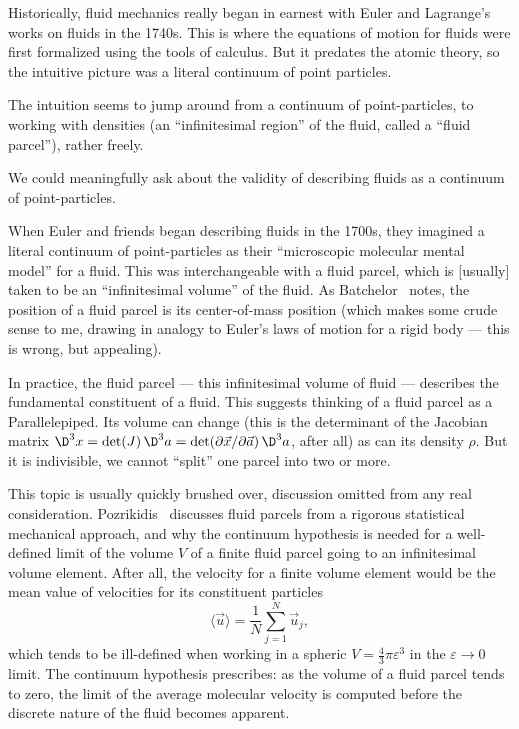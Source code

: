 \begin{node}\label{fluids:describing-0009}%
Historically, fluid mechanics really began in earnest with Euler and
Lagrange's works on fluids in the 1740s. This is where the equations of
motion for fluids were first formalized using the tools of calculus. But
it predates the atomic theory, so the intuitive picture was a literal
continuum of point particles.

The intuition seems to jump around from a continuum of point-particles,
to working with densities (an ``infinitesimal region'' of the fluid,
called a ``fluid parcel''), rather freely.

We could meaningfully ask about the validity of describing fluids as a
continuum of point-particles.

\begin{node}\label{fluids:describing-000O}%
When Euler and friends began describing fluids in the 1700s, they
imagined a literal continuum of point-particles as their ``microscopic
molecular mental model'' for a fluid. This was interchangeable with a
fluid parcel, which is [usually] taken to be an ``infinitesimal volume''
of the fluid. As Batchelor~\cite[pg.71]{batchelor1967introduction}
notes, the position of a fluid parcel is its center-of-mass position
(which makes some crude sense to me, drawing in analogy to Euler's laws
of motion for a rigid body --- this is wrong, but appealing).

In practice, the fluid parcel --- this infinitesimal volume of fluid ---
describes the fundamental constituent of a fluid. This suggests thinking
of a fluid parcel as a Parallelepiped. Its volume can change (this is
the determinant of the Jacobian matrix
$\D^{3}x=\det(J)\,\D^{3}a=\det(\partial\vec{x}/\partial\vec{a})\,\D^{3}a$,
after all) as can its density $\rho$. But it is indivisible, we cannot
``split'' one parcel into two or more.

This topic is usually quickly brushed over, discussion omitted from any
real consideration. Pozrikidis~\cite[\S1.4]{pozrikidis2009fluid}
discusses fluid parcels from a rigorous statistical mechanical approach,
and why the continuum hypothesis is needed for a well-defined limit of
the volume $V$ of a finite fluid parcel going to an infinitesimal volume
element. After all, the velocity for a finite volume element would be
the mean value of velocities for its constituent particles
\begin{equation}
\langle\vec{u}\rangle=\frac{1}{N}\sum^{N}_{j=1}\vec{u}_{j},
\end{equation}
which tends to be ill-defined when working in a spheric
$V=\frac{4}{3}\pi\varepsilon^{3}$ in the $\varepsilon\to0$ limit.
The continuum hypothesis prescribes: as the volume of a fluid parcel
tends to zero, the limit of the average molecular velocity is computed
before the discrete nature of the fluid becomes apparent.


\end{node}
\end{node}
